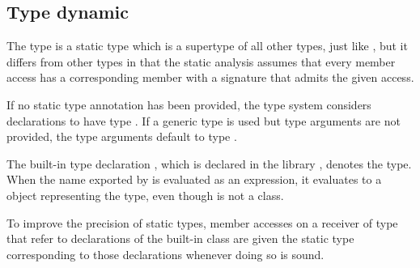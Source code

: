 \documentclass[makeidx]{article}
\begin{document}
{\subsection{Type dynamic}

\LMHash{}%
The type \DYNAMIC{} is a static type which is a supertype of all other types,
just like ,
but it differs from other types in that the static analysis
assumes that every member access has a corresponding member
with a signature that admits the given access.


\LMHash{}%
If no static type annotation has been provided,
the type system considers declarations to have type \DYNAMIC.
If a generic type is used but type arguments are not provided,
the type arguments default to type \DYNAMIC.


\LMHash{}%
The built-in type declaration ,
which is declared in the library ,
denotes the \DYNAMIC{} type.
When the name \DYNAMIC{} exported by  is evaluated
as an expression,
it evaluates to a  object representing the \DYNAMIC{} type,
even though \DYNAMIC{} is not a class.


\LMHash{}%
To improve the precision of static types,
member accesses on a receiver of type \DYNAMIC{} that refer to
declarations of the built-in class 
are given the static type corresponding to those declarations
whenever doing so is sound.

}
\end{document}

